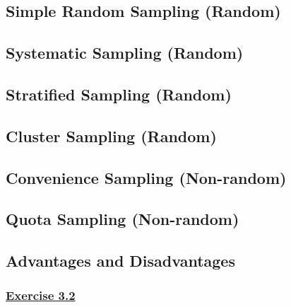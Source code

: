 \documentclass[
  11pt,
]{book}
\begin{document}
\subsection*{Simple Random Sampling (Random)}\label{simple-random-sampling-random}

\subsection*{Systematic Sampling (Random)}\label{systematic-sampling-random}

\subsection*{Stratified Sampling (Random)}\label{stratified-sampling-random}

\subsection*{Cluster Sampling (Random)}\label{cluster-sampling-random}

\subsection*{Convenience Sampling (Non-random)}\label{convenience-sampling-non-random}

\subsection*{Quota Sampling (Non-random)}\label{quota-sampling-non-random}

\subsection*{Advantages and Disadvantages}\label{advantages-and-disadvantages}

\subsubsection*{\texorpdfstring{\hyperref[ex32a]{Exercise 3.2}}{Exercise 3.2}}\label{exercise-3.2}
\end{document}
